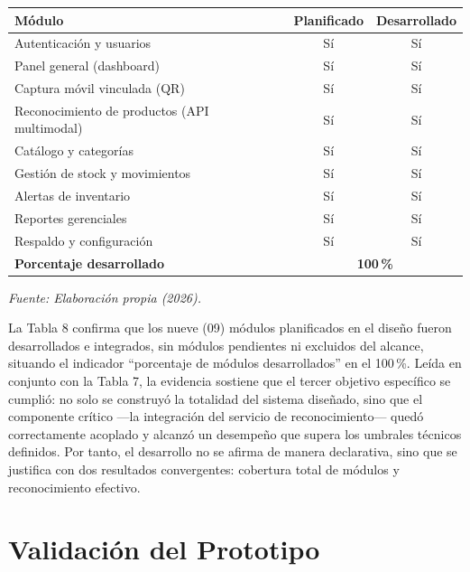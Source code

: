 \documentclass[12pt, letterpaper]{report}
\begin{document}
\begin{center}
\begin{tabular}{|>{\raggedright\arraybackslash}p{6.5cm}|c|c|}
\hline
\textbf{Módulo} & \textbf{Planificado} & \textbf{Desarrollado} \\
\hline
Autenticación y usuarios & Sí & Sí \\
\hline
Panel general (dashboard) & Sí & Sí \\
\hline
Captura móvil vinculada (QR) & Sí & Sí \\
\hline
Reconocimiento de productos (API multimodal) & Sí & Sí \\
\hline
Catálogo y categorías & Sí & Sí \\
\hline
Gestión de stock y movimientos & Sí & Sí \\
\hline
Alertas de inventario & Sí & Sí \\
\hline
Reportes gerenciales & Sí & Sí \\
\hline
Respaldo y configuración & Sí & Sí \\
\hline
\textbf{Porcentaje desarrollado} &
\multicolumn{2}{c|}{\textbf{100\,\%}} \\
\hline
\end{tabular}
\end{center}
\vspace{2pt}
\noindent\small\textit{Fuente: Elaboración propia (2026).}\normalsize
{}

\vspace{6pt}

La Tabla 8 confirma que los nueve (09) módulos planificados en el
diseño fueron desarrollados e integrados, sin módulos pendientes ni
excluidos del alcance, situando el indicador ``porcentaje de módulos
desarrollados'' en el 100\,\%. Leída en conjunto con la Tabla 7, la
evidencia sostiene que el tercer objetivo específico se cumplió: no
solo se construyó la totalidad del sistema diseñado, sino que el
componente crítico ---la integración del servicio de reconocimiento---
quedó correctamente acoplado y alcanzó un desempeño que supera los
umbrales técnicos definidos. Por tanto, el desarrollo no se afirma de
manera declarativa, sino que se justifica con dos resultados
convergentes: cobertura total de módulos y reconocimiento efectivo.

\section{Validación del Prototipo}
\end{document}
